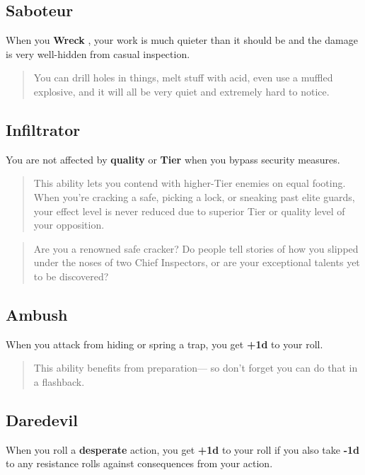 \documentclass[11pt,oneside]{book}
\newcommand{\gameterm}[1]{\textbf{#1}}
\begin{document}
\subsection{Saboteur}

When you \gameterm{Wreck} , your work is much quieter than it should be and the damage is very well-hidden from casual inspection.

\begin{quote}
	You can drill holes in things, melt stuff with acid, even use a muffled explosive, and it will all be very quiet and extremely hard to notice.
\end{quote} 

\subsection{Infiltrator}

You are not affected by \textbf{quality} or \textbf{Tier} when you bypass security measures.

\begin{quote}
	This ability lets you contend with higher-Tier enemies on equal footing. When you’re cracking a safe, picking a lock, or sneaking past elite guards, your effect level is never reduced due to superior Tier or quality level of your opposition.
\end{quote} 

\begin{quote}
	Are you a renowned safe cracker? Do people tell stories of how you slipped under the noses of two Chief Inspectors, or are your exceptional talents yet to be discovered?
\end{quote} 

\subsection{Ambush}

When you attack from hiding or spring a trap, you get \textbf{+1d} to your roll.

\begin{quote}
	This ability benefits from preparation--- so don’t forget you can do that in a flashback.
\end{quote} 

\subsection{Daredevil}

When you roll a \textbf{desperate} action, you get \textbf{+1d} to your roll if you also take \textbf{-1d} to any resistance rolls against consequences from your action.
\end{document}
